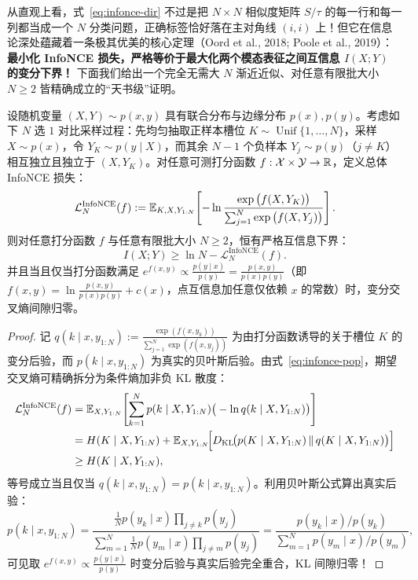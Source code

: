 从直观上看，式~\eqref{eq:infonce-dir} 不过是把 $N \times N$ 相似度矩阵 $S/\tau$ 的每一行和每一列都当成一个 $N$ 分类问题，正确标签恰好落在主对角线 $(i, i)$ 上！但它在信息论深处蕴藏着一条极其优美的核心定理（Oord et al., 2018; Poole et al., 2019）：\textbf{最小化 InfoNCE 损失，严格等价于最大化两个模态表征之间互信息 $I(X; Y)$ 的变分下界！} 下面我们给出一个完全无需大 $N$ 渐近近似、对任意有限批大小 $N \ge 2$ 皆精确成立的“天书级”证明。

\begin{thmBox}
\begin{theorem}
\label{thm:infonce-mi}
设随机变量 $(X, Y) \sim p(x, y)$ 具有联合分布与边缘分布 $p(x), p(y)$。考虑如下 $N$ 选 $1$ 对比采样过程：先均匀抽取正样本槽位 $K \sim \operatorname{Unif}\{1, \dots, N\}$，采样 $X \sim p(x)$，令 $Y_K \sim p(y \mid X)$，而其余 $N-1$ 个负样本 $Y_j \sim p(y)$（$j \ne K$）相互独立且独立于 $(X, Y_K)$。对任意可测打分函数 $f: \mathcal{X} \times \mathcal{Y} \to \mathbb{R}$，定义总体 InfoNCE 损失：
\begin{equation}
  \mathcal{L}_N^{\mathrm{InfoNCE}}(f)
  := \mathbb{E}_{K, X, Y_{1:N}}\!\left[-\ln \frac{\exp\big(f(X, Y_K)\big)}{\sum_{j=1}^{N} \exp\big(f(X, Y_j)\big)}\right].
  \label{eq:infonce-pop}
\end{equation}
则对任意打分函数 $f$ 与任意有限批大小 $N \ge 2$，恒有严格互信息下界：
\begin{equation}
  I(X; Y) \ge \ln N - \mathcal{L}_N^{\mathrm{InfoNCE}}(f).
  \label{eq:infonce-mi-bound}
\end{equation}
并且当且仅当打分函数满足 $e^{f(x, y)} \propto \frac{p(y \mid x)}{p(y)} = \frac{p(x, y)}{p(x)p(y)}$（即 $f(x, y) = \ln \frac{p(x, y)}{p(x)p(y)} + c(x)$，点互信息加任意仅依赖 $x$ 的常数）时，变分交叉熵间隙归零。
\end{theorem}
\begin{proof}
记 $q(k \mid x, y_{1:N}) := \frac{\exp(f(x, y_k))}{\sum_{j=1}^N \exp(f(x, y_j))}$ 为由打分函数诱导的关于槽位 $K$ 的变分后验，而 $p(k \mid x, y_{1:N})$ 为真实的贝叶斯后验。由式~\eqref{eq:infonce-pop}，期望交叉熵可精确拆分为条件熵加非负 KL 散度：
\begin{align}
  \mathcal{L}_N^{\mathrm{InfoNCE}}(f)
  &= \mathbb{E}_{X, Y_{1:N}}\!\left[\sum_{k=1}^{N} p(k \mid X, Y_{1:N})\big(-\ln q(k \mid X, Y_{1:N})\big)\right] \nonumber \\
  &= H(K \mid X, Y_{1:N}) + \mathbb{E}_{X, Y_{1:N}}\!\Big[D_{\mathrm{KL}}\!\big(p(K \mid X, Y_{1:N}) \,\|\, q(K \mid X, Y_{1:N})\big)\Big] \nonumber \\
  &\ge H(K \mid X, Y_{1:N}), \label{eq:infonce-step1}
\end{align}
等号成立当且仅当 $q(k \mid x, y_{1:N}) = p(k \mid x, y_{1:N})$。利用贝叶斯公式算出真实后验：
\[
  p(k \mid x, y_{1:N})
  = \frac{\frac{1}{N} p(y_k \mid x) \prod_{j \ne k} p(y_j)}{\sum_{m=1}^{N} \frac{1}{N} p(y_m \mid x) \prod_{j \ne m} p(y_j)}
  = \frac{p(y_k \mid x)/p(y_k)}{\sum_{m=1}^{N} p(y_m \mid x)/p(y_m)},
\]
可见取 $e^{f(x, y)} \propto \frac{p(y\mid x)}{p(y)}$ 时变分后验与真实后验完全重合，KL 间隙归零！


\end{proof}
\end{thmBox}
